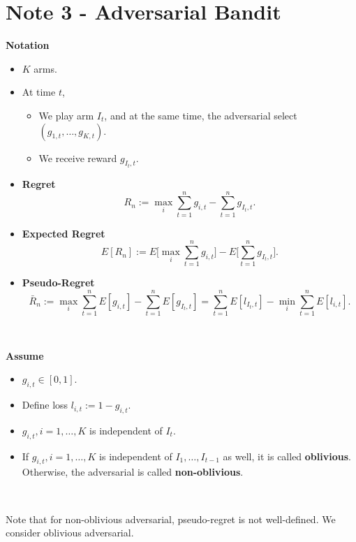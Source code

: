 \clearpage
\section{Note 3 - Adversarial Bandit}

\textbf{Notation}
\begin{itemize}
    \item $K$ arms.
    \item At time $t$,
        \begin{itemize}
            \item We play arm $I_t$, and at the same time,
                the adversarial select $(g_{1,t}, \dots, g_{K,t})$.
            \item We receive reward $g_{I_t, t}$.
        \end{itemize}
        \item \textbf{Regret}
        \begin{equation}
            R_n := \max_i \sum_{t=1}^n g_{i,t} - \sum_{t=1}^n g_{I_t, t}.
        \end{equation}
        \item \textbf{Expected Regret}
        \begin{equation}
            E[R_n] := E\bigg[\max_i \sum_{t=1}^n g_{i,t}\bigg] - E\bigg[\sum_{t=1}^n g_{I_t, t}\bigg].
        \end{equation}
        \item \textbf{Pseudo-Regret}
        \begin{equation}
            \bar R_n := \max_i \sum_{t=1}^n E[g_{i,t}] - \sum_{t=1}^n E[g_{I_t, t}]
                = \sum_{t=1}^n E[l_{I_t, t}] - \min_i \sum_{t=1}^n E[l_{i,t}].
        \end{equation}
\end{itemize}
\

\textbf{Assume}
\begin{itemize}
    \item $g_{i,t}\in[0,1]$.
    \item Define loss $l_{i,t}:=1-g_{i,t}$.
    \item $g_{i,t}, i=1,\dots,K$ is independent of $I_t$.
    \item If $g_{i,t}, i=1,\dots,K$ is independent of $I_1, \dots, I_{t-1}$ as well,
        it is called \textbf{oblivious}.
        Otherwise, the adversarial is called \textbf{non-oblivious}.
\end{itemize}
\

Note that for non-oblivious adversarial, pseudo-regret is not well-defined.
We consider oblivious adversarial.

